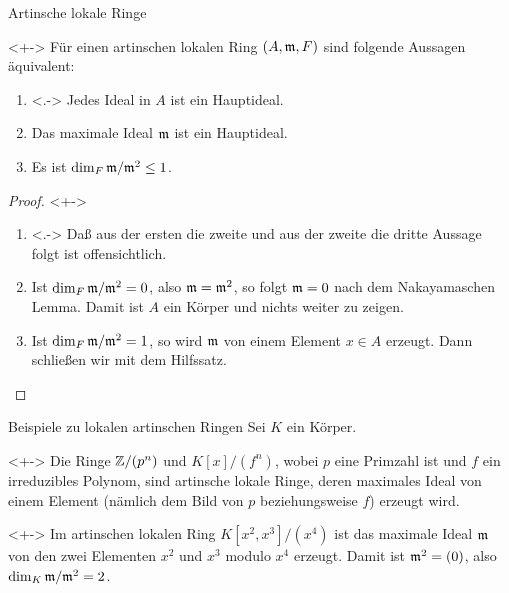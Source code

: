 \begin{frame}{Artinsche lokale Ringe}
	\begin{proposition}<+->
		Für einen artinschen lokalen Ring \((A, \mathfrak{m}, F)\) sind folgende Aussagen äquivalent:
		\begin{enumerate}[<+->]
		\item<.->
			Jedes Ideal in \(A\) ist ein Hauptideal.
		\item
			Das maximale Ideal \(\mathfrak{m}\) ist ein Hauptideal.
		\item
			Es ist \(\dim_F \mathfrak{m}/\mathfrak{m}^2 \leq 1\).
		\end{enumerate}
	\end{proposition}
	\begin{proof}<+->
		\begin{enumerate}[<+->]
		\item<.->
			Daß aus der ersten die zweite und aus der zweite die dritte Aussage folgt ist offensichtlich.
		\item
			Ist \(\dim_F \mathfrak{m}/\mathfrak{m}^2 = 0\), also \(\mathfrak{m} = \mathfrak{m}^2\), so folgt \(\mathfrak{m} = 0\)
			nach dem Nakayamaschen Lemma. Damit ist \(A\) ein Körper und nichts weiter zu zeigen.
		\item
			Ist \(\dim_F \mathfrak{m}/\mathfrak{m}^2 = 1\), so wird \(\mathfrak{m}\) von einem Element \(x \in A\) erzeugt.
			Dann schließen wir mit dem Hilfssatz.
			\qedhere
		\end{enumerate}
	\end{proof}
\end{frame}

\begin{frame}{Beispiele zu lokalen artinschen Ringen}
	Sei \(K\) ein Körper.
	\begin{example}<+->
		Die Ringe \(\mathbb Z/(p^n)\) und \(K[x]/(f^n)\), wobei \(p\) eine Primzahl ist und \(f\) ein
		irreduzibles Polynom, sind artinsche lokale Ringe, deren maximales Ideal
		von einem Element (nämlich dem Bild von \(p\) beziehungsweise \(f\)) erzeugt wird.
	\end{example}
	\begin{example}<+->
		Im artinschen lokalen Ring \(K[x^2, x^3]/(x^4)\) ist das maximale Ideal \(\mathfrak{m}\)
		von den zwei Elementen \(x^2\) und \(x^3\) modulo \(x^4\) erzeugt. Damit ist
		\(\mathfrak{m}^2 = (0)\), also \(\dim_K \mathfrak{m}/\mathfrak{m}^2 = 2\).
	\end{example}
\end{frame}


